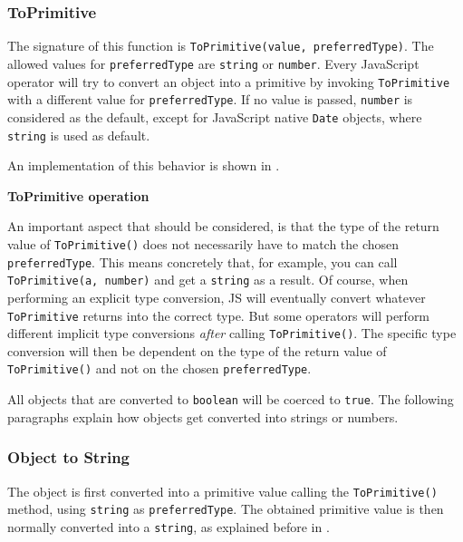 \subsubsection{ToPrimitive}
The signature of this function is \texttt{ToPrimitive(value, preferredType)}. The allowed values for \texttt{preferredType} are \texttt{string} or \texttt{number}. Every JavaScript operator will try to convert an object into a primitive by invoking \texttt{ToPrimitive} with a different value for \texttt{preferredType}. If no value is passed, \texttt{number} is considered as the default, except for JavaScript native \texttt{Date} objects, where \texttt{string} is used as default.

An implementation of this behavior is shown in .

\begin{code}
	\captionsetup{aboveskip=0pt, belowskip=10pt}
	\caption[ToPrimitive operation]{\textbf{ToPrimitive operation}}
	\label{code:background-to-primitive-operation}
\end{code}

An important aspect that should be considered, is that the type of the return value of \texttt{ToPrimitive()} does not necessarily have to match the chosen \texttt{preferredType}. This means concretely that, for example, you can call \texttt{ToPrimitive(a, number)} and get a \texttt{string} as a result. Of course, when performing an explicit type conversion, JS will eventually convert whatever \texttt{ToPrimitive} returns into the correct type. But some operators will perform different implicit type conversions \textit{after} calling \texttt{ToPrimitive()}. The specific type conversion will then be dependent on the type of the return value of \texttt{ToPrimitive()} and not on the chosen \texttt{preferredType}.

All objects that are converted to \texttt{boolean} will be coerced to \texttt{true}. The following paragraphs explain how objects get converted into strings or numbers.

\subsubsection{Object to String}
The object is first converted into a primitive value calling the \texttt{ToPrimitive()} method, using \texttt{string} as \texttt{preferredType}. The obtained primitive value is then normally converted into a \texttt{string}, as explained before in .

